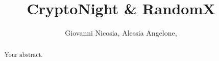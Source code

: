 \documentclass{report}
\title{CryptoNight \& RandomX} %
\author{Giovanni Nicosia, Alessia Angelone, } %
\begin{document}
\maketitle

\begin{abstract}
Your abstract.
\end{abstract}





\end{document}
